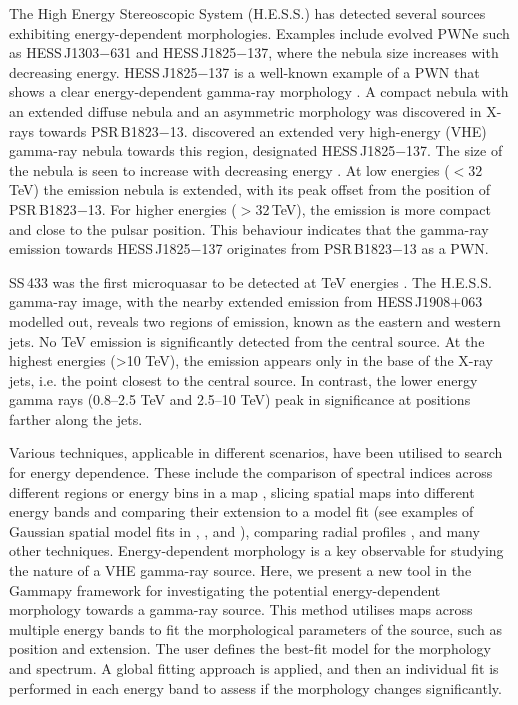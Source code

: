 \documentclass{aa}
\newcommand{\hessj}{HESS\,J1825$-$137\xspace}
\newcommand{\psr}{PSR\,B1823$-$13\xspace}
\begin{document}
The High Energy Stereoscopic System (H.E.S.S.) has detected several sources exhibiting energy-dependent morphologies. Examples include evolved PWNe such as HESS\,J1303$-$631 \citep{Edep_J1303_2012} and \hessj, where the nebula size increases with decreasing energy. \hessj is a well-known example of a PWN that shows a clear energy-dependent gamma-ray morphology \citep{Edep_PWNe_HESS_2006,Edep_PWNe_HESS_2019,Edep_Principe_2020}. A compact nebula with an extended diffuse nebula and an asymmetric morphology was discovered in X-rays towards \psr  \citep{Finley_1996}. \cite{HESS_2005} discovered an extended very high-energy (VHE) gamma-ray nebula towards this region, designated \hessj. The size of the nebula is seen to increase with decreasing energy \citep{Edep_PWNe_HESS_2019}. At low energies ($< 32$\,TeV) the emission nebula is extended, with its peak offset from the position of \psr. For higher energies ($> 32$\,TeV), the emission is more compact and close to the pulsar position. This behaviour indicates that the gamma-ray emission towards \hessj originates from PSR\,B1823$-$13 as a PWN. 

SS\,433 was the first microquasar to be detected at TeV energies \citep{HAWC_micro_2018,SS433_Laura_2024}. The H.E.S.S. gamma-ray image, with the nearby extended emission from HESS\,J1908$+$063 modelled out, reveals two regions of emission, known as the eastern and western jets. No TeV emission is significantly detected from the central source. At the highest energies (>10 TeV), the emission appears only in the base of the X-ray jets, i.e. the point closest to the central source. In contrast, the lower energy gamma rays (0.8–2.5 TeV and 2.5–10 TeV) peak in significance at positions farther along the jets. 

Various techniques, applicable in different scenarios, have been utilised to search for energy dependence. These include the comparison of spectral indices across different regions or energy bins in a map \citep{Edep_PWNe_HESS_2006}, slicing spatial maps into different energy bands and comparing their extension to a model fit (see examples of Gaussian spatial model fits in \citealt{Edep_J1303_2012}, \citealt{Edep_Principe_2020}, and \citealt{Edep_MAGIC_2020}), comparing radial profiles \citep{Edep_Principe_2020}, and many other techniques. 
Energy-dependent morphology is a key observable for studying the nature of a VHE gamma-ray source. 
Here, we present a new tool in the Gammapy framework \citep{gammapy_ref,gammapy_zenodo_12} for investigating the potential energy-dependent morphology towards a gamma-ray source. 
This method utilises maps across multiple energy bands to fit the morphological parameters of the source, such as position and extension. 
The user defines the best-fit model for the morphology and spectrum. 
A global fitting approach is applied, and then an individual fit is performed in each energy band to assess if the morphology changes significantly.
\end{document}
